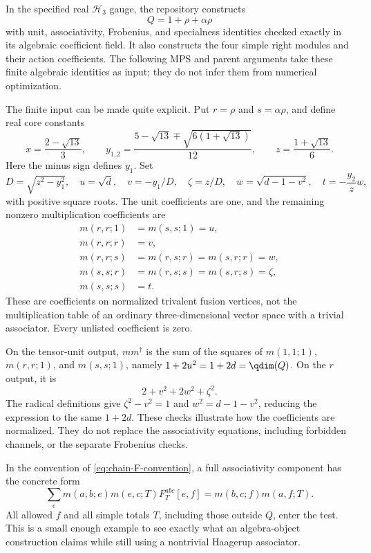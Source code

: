 \begin{constructioninput}
In the specified real $\mathcal H_3$ gauge, the repository constructs
\[
 Q=1+\rho+\alpha\rho
\]
with unit, associativity, Frobenius, and specialness identities
checked exactly in its algebraic coefficient field. It also constructs
the four simple right modules and their action coefficients. The
following MPS and parent arguments take these finite algebraic
identities as input; they do not infer them from numerical
optimization.
\end{constructioninput}

The finite input can be made quite explicit. Put $r=\rho$ and
$s=\alpha\rho$, and define real core constants
\[
 x=\frac{2-\sqrt{13}}3,\qquad
 y_{1,2}=\frac{5-\sqrt{13}\mp\sqrt{6(1+\sqrt{13})}}{12},
 \qquad z=\frac{1+\sqrt{13}}6.
\]
Here the minus sign defines $y_1$. Set
\[
 D=\sqrt{z^2-y_1^2},\quad u=\sqrt d,\quad
 v=-y_1/D,\quad\zeta=z/D,\quad
 w=\sqrt{d-1-v^2},\quad t=-\frac{y_2}{z}w,
\]
with positive square roots. The unit coefficients are one, and the
remaining nonzero multiplication coefficients are
\begin{align*}
 m(r,r;1)&=m(s,s;1)=u,\\
 m(r,r;r)&=v,\\
 m(r,r;s)&=m(r,s;r)=m(s,r;r)=w,\\
 m(s,s;r)&=m(r,s;s)=m(s,r;s)=\zeta,\\
 m(s,s;s)&=t.
\end{align*}
These are coefficients on normalized trivalent fusion vertices, not
the multiplication table of an ordinary three-dimensional vector
space with a trivial associator. Every unlisted coefficient is zero.

\begin{example}
On the tensor-unit output, $mm^\dagger$ is the sum of the squares
of $m(1,1;1)$, $m(r,r;1)$, and $m(s,s;1)$, namely
$1+2u^2=1+2d=\qdim(Q)$. On the $r$ output, it is
\[
 2+v^2+2w^2+\zeta^2.
\]
The radical definitions give $\zeta^2-v^2=1$ and
$w^2=d-1-v^2$, reducing the expression to the same $1+2d$.
These checks illustrate how the coefficients are normalized. They
do not replace the associativity equations, including forbidden
channels, or the separate Frobenius checks.
\end{example}

In the convention of \eqref{eq:chain-F-convention}, a full
associativity component has the concrete form
\[
 \sum_e m(a,b;e)m(e,c;T)F^{abc}_T[e,f]
       =m(b,c;f)m(a,f;T).
\]
All allowed $f$ and all simple totals $T$, including those outside
$Q$, enter the test. This is a small enough example to see exactly
what an algebra-object construction claims while still using a
nontrivial Haagerup associator.

